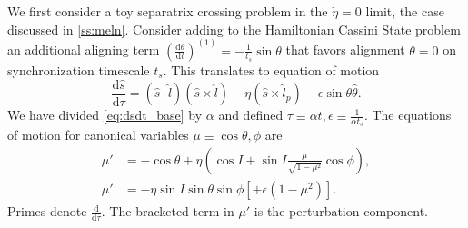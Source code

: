 \documentclass[
        fleqn,
        usenatbib,
    ]{mnras}
\newcommand*{\rd}[2]{\frac{\mathrm{d}#1}{\mathrm{d}#2}}
\newcommand*{\p}[1]{\left(#1\right)}
\newcommand*{\s}[1]{\left[#1\right]}
\begin{document}
We first consider a toy separatrix crossing problem in the $\dot{\eta} = 0$
limit, the case discussed in \autoref{ss:meln}. Consider adding to the
Hamiltonian Cassini State problem an additional aligning term
$\p{\rd{\theta}{t}}^{(1)} = -\frac{1}{t_s}\sin\theta$ that favors alignment
$\theta = 0$ on synchronization timescale $t_s$. This translates to equation of
motion
\begin{equation}
    \rd{\hat{s}}{\tau} = \p{\hat{s} \cdot \hat{l}}\p{\hat{s} \times \hat{l}}
        - \eta\p{\hat{s} \times \hat{l}_p}
        - \epsilon \sin \theta \hat{\theta}.
\end{equation}
We have divided \autoref{eq:dsdt_base} by $\alpha$ and defined $\tau \equiv
\alpha t, \epsilon \equiv \frac{1}{\alpha t_s}$. The equations of motion for
canonical variables $\mu \equiv \cos\theta, \phi$ are
\begin{subequations}\label{se:p1_eom}
    \begin{align}
        \mu' &= -\cos\theta
            + \eta\p{\cos I + \sin I \frac{\mu}{\sqrt{1 - \mu^2}} \cos \phi},\\
        \mu' &= -\eta \sin I \sin \theta \sin \phi
            \s{+ \epsilon\p{1 - \mu^2}}.
    \end{align}
\end{subequations}
Primes denote $\rd{}{\tau}$. The bracketed term in $\mu'$ is the perturbation
component.
\end{document}
